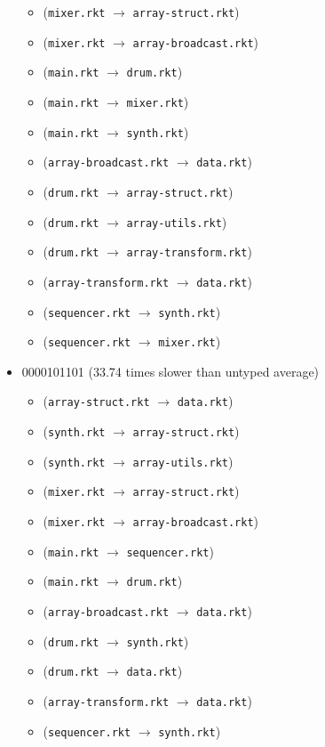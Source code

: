 \documentclass{article}
\newcommand{\mono}[1]{\texttt{#1}}
\begin{document}
\begin{itemize}
\begin{itemize}
  \item (\mono{mixer.rkt} $\rightarrow$ \mono{array-struct.rkt})
  \item (\mono{mixer.rkt} $\rightarrow$ \mono{array-broadcast.rkt})
  \item (\mono{main.rkt} $\rightarrow$ \mono{drum.rkt})
  \item (\mono{main.rkt} $\rightarrow$ \mono{mixer.rkt})
  \item (\mono{main.rkt} $\rightarrow$ \mono{synth.rkt})
  \item (\mono{array-broadcast.rkt} $\rightarrow$ \mono{data.rkt})
  \item (\mono{drum.rkt} $\rightarrow$ \mono{array-struct.rkt})
  \item (\mono{drum.rkt} $\rightarrow$ \mono{array-utils.rkt})
  \item (\mono{drum.rkt} $\rightarrow$ \mono{array-transform.rkt})
  \item (\mono{array-transform.rkt} $\rightarrow$ \mono{data.rkt})
  \item (\mono{sequencer.rkt} $\rightarrow$ \mono{synth.rkt})
  \item (\mono{sequencer.rkt} $\rightarrow$ \mono{mixer.rkt})
  \end{itemize}
\item 0000101101 (33.74 times slower than untyped average)
  \begin{itemize}
  \item (\mono{array-struct.rkt} $\rightarrow$ \mono{data.rkt})
  \item (\mono{synth.rkt} $\rightarrow$ \mono{array-struct.rkt})
  \item (\mono{synth.rkt} $\rightarrow$ \mono{array-utils.rkt})
  \item (\mono{mixer.rkt} $\rightarrow$ \mono{array-struct.rkt})
  \item (\mono{mixer.rkt} $\rightarrow$ \mono{array-broadcast.rkt})
  \item (\mono{main.rkt} $\rightarrow$ \mono{sequencer.rkt})
  \item (\mono{main.rkt} $\rightarrow$ \mono{drum.rkt})
  \item (\mono{array-broadcast.rkt} $\rightarrow$ \mono{data.rkt})
  \item (\mono{drum.rkt} $\rightarrow$ \mono{synth.rkt})
  \item (\mono{drum.rkt} $\rightarrow$ \mono{data.rkt})
  \item (\mono{array-transform.rkt} $\rightarrow$ \mono{data.rkt})
  \item (\mono{sequencer.rkt} $\rightarrow$ \mono{synth.rkt})

\end{itemize}
\end{itemize}
\end{document}
